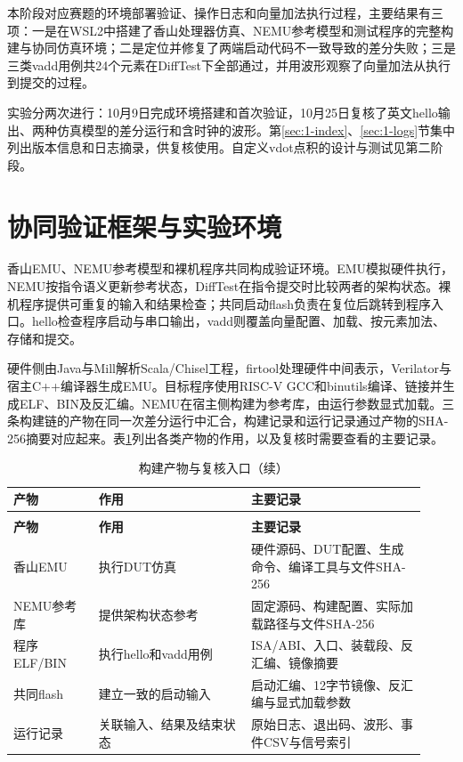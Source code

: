 \renewcommand{\stagefigureprefix}{1}\setcounter{figure}{0}

本阶段对应赛题的环境部署验证、操作日志和向量加法执行过程，主要结果有三项：一是在WSL2中搭建了香山处理器仿真、NEMU参考模型和测试程序的完整构建与协同仿真环境；二是定位并修复了两端启动代码不一致导致的差分失败；三是三类vadd用例共24个元素在DiffTest下全部通过，并用波形观察了向量加法从执行到提交的过程。

实验分两次进行：10月9日完成环境搭建和首次验证，10月25日复核了英文hello输出、两种仿真模型的差分运行和含时钟的波形。第\ref{sec:1-index}、\ref{sec:1-logs}节集中列出版本信息和日志摘录，供复核使用。自定义vdot点积的设计与测试见第二阶段。

\section{协同验证框架与实验环境}

香山EMU、NEMU参考模型和裸机程序共同构成验证环境。EMU模拟硬件执行，NEMU按指令语义更新参考状态，DiffTest在指令提交时比较两者的架构状态。裸机程序提供可重复的输入和结果检查；共同启动flash负责在复位后跳转到程序入口。hello检查程序启动与串口输出，vadd则覆盖向量配置、加载、按元素加法、存储和提交。

硬件侧由Java与Mill解析Scala/Chisel工程，firtool处理硬件中间表示，Verilator与宿主C++编译器生成EMU。目标程序使用RISC-V GCC和binutils编译、链接并生成ELF、BIN及反汇编。NEMU在宿主侧构建为参考库，由运行参数显式加载。三条构建链的产物在同一次差分运行中汇合，构建记录和运行记录通过产物的SHA-256摘要对应起来。表\ref{tab:s1-artifacts}列出各类产物的作用，以及复核时需要查看的主要记录。

{\small\setlength{\tabcolsep}{3pt}\begin{longtable}{>{\raggedright\arraybackslash}p{0.19\linewidth}>{\raggedright\arraybackslash}p{0.34\linewidth}>{\raggedright\arraybackslash}p{0.39\linewidth}}
\caption{构建产物与复核入口}\label{tab:s1-artifacts}\\
\toprule
\textbf{产物} & \textbf{作用} & \textbf{主要记录}\\\midrule\endfirsthead
\caption[]{构建产物与复核入口（续）}\\
\toprule
\textbf{产物} & \textbf{作用} & \textbf{主要记录}\\\midrule\endhead
香山EMU & 执行DUT仿真 & 硬件源码、DUT配置、生成命令、编译工具与文件SHA-256\\
NEMU参考库 & 提供架构状态参考 & 固定源码、构建配置、实际加载路径与文件SHA-256\\
程序ELF/BIN & 执行hello和vadd用例 & ISA/ABI、入口、装载段、反汇编、镜像摘要\\
共同flash & 建立一致的启动输入 & 启动汇编、12字节镜像、反汇编与显式加载参数\\
运行记录 & 关联输入、结果及结束状态 & 原始日志、退出码、波形、事件CSV与信号索引\\
\bottomrule\end{longtable}}

